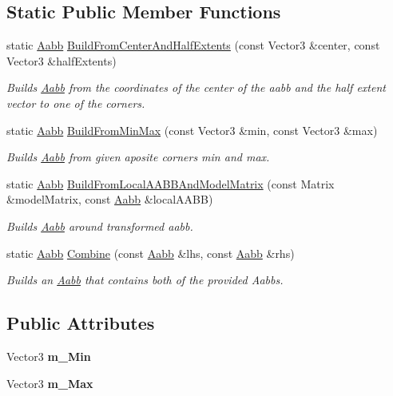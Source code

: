 \subsection*{Static Public Member Functions}
\begin{DoxyCompactItemize}
\item 
static \hyperlink{classAabb}{Aabb} \hyperlink{classAabb_a97ee8719ddae080c16c206f5724b5a9f}{Build\+From\+Center\+And\+Half\+Extents} (const Vector3 \&center, const Vector3 \&half\+Extents)
\begin{DoxyCompactList}\small\item\em Builds \hyperlink{classAabb}{Aabb} from the coordinates of the center of the aabb and the half extent vector to one of the corners. \end{DoxyCompactList}\item 
static \hyperlink{classAabb}{Aabb} \hyperlink{classAabb_a3b8654c48a3713faebbe7490e261eb6e}{Build\+From\+Min\+Max} (const Vector3 \&min, const Vector3 \&max)
\begin{DoxyCompactList}\small\item\em Builds \hyperlink{classAabb}{Aabb} from given aposite corners min and max. \end{DoxyCompactList}\item 
static \hyperlink{classAabb}{Aabb} \hyperlink{classAabb_a32c65313d0c0b6f3918473340cd7c129}{Build\+From\+Local\+A\+A\+B\+B\+And\+Model\+Matrix} (const Matrix \&model\+Matrix, const \hyperlink{classAabb}{Aabb} \&local\+A\+A\+BB)
\begin{DoxyCompactList}\small\item\em Builds \hyperlink{classAabb}{Aabb} around transformed aabb. \end{DoxyCompactList}\item 
static \hyperlink{classAabb}{Aabb} \hyperlink{classAabb_a7f6f3ebe0340505f04b8bf1fc81c7e5f}{Combine} (const \hyperlink{classAabb}{Aabb} \&lhs, const \hyperlink{classAabb}{Aabb} \&rhs)
\begin{DoxyCompactList}\small\item\em Builds an \hyperlink{classAabb}{Aabb} that contains both of the provided Aabbs. \end{DoxyCompactList}\end{DoxyCompactItemize}
\subsection*{Public Attributes}
\begin{DoxyCompactItemize}
\item 
\mbox{\label{classAabb_ad97407c0cde4852c9d5b490c1f602302}} 
Vector3 {\bfseries m\+\_\+\+Min}
\item 
\mbox{\label{classAabb_a57e862b50109cbaa0e5b731060963bf9}} 
Vector3 {\bfseries m\+\_\+\+Max}
\end{DoxyCompactItemize}


